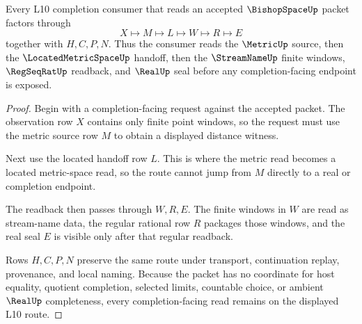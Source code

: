 \begin{theorem}
\label{thm:bishop-space-located-metric-handoff}
Every L10 completion consumer that reads an accepted $\BishopSpaceUp$ packet factors through
$$
X\longmapsto M\longmapsto L\longmapsto W\longmapsto R\longmapsto E
$$
together with $H,C,P,N$. Thus the consumer reads the $\MetricUp$ source, then the $\LocatedMetricSpaceUp$ handoff, then the $\StreamNameUp$ finite windows, $\RegSeqRatUp$ readback, and $\RealUp$ seal before any completion-facing endpoint is exposed.
\end{theorem}
\begin{proof}
Begin with a completion-facing request against the accepted packet. The observation row $X$ contains only finite point windows, so the request must use the metric source row $M$ to obtain a displayed distance witness.

Next use the located handoff row $L$. This is where the metric read becomes a located metric-space read, so the route cannot jump from $M$ directly to a real or completion endpoint.

The readback then passes through $W,R,E$. The finite windows in $W$ are read as stream-name data, the regular rational row $R$ packages those windows, and the real seal $E$ is visible only after that regular readback.

Rows $H,C,P,N$ preserve the same route under transport, continuation replay, provenance, and local naming. Because the packet has no coordinate for host equality, quotient completion, selected limits, countable choice, or ambient $\RealUp$ completeness, every completion-facing read remains on the displayed L10 route.
\end{proof}




